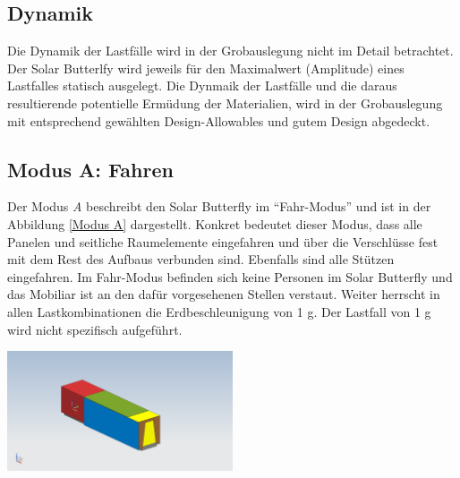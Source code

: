 \subsection{Dynamik}
Die Dynamik der Lastfälle wird in der Grobauslegung nicht im Detail betrachtet. Der Solar Butterlfy wird jeweils für den Maximalwert (Amplitude) eines Lastfalles statisch ausgelegt. Die Dynmaik der Lastfälle und die daraus resultierende potentielle Ermüdung der Materialien, wird in der Grobauslegung mit entsprechend gewählten Design-Allowables und gutem Design abgedeckt.

\subsection{Modus A: Fahren}
Der Modus \emph{A} beschreibt den Solar Butterfly im ``Fahr-Modus'' und ist in der Abbildung \ref{Modus A} dargestellt. Konkret bedeutet dieser Modus, dass alle Panelen und seitliche Raumelemente eingefahren und über die Verschlüsse fest mit dem Rest des Aufbaus verbunden sind. Ebenfalls sind alle Stützen eingefahren. Im Fahr-Modus befinden sich keine Personen im Solar Butterfly und das Mobiliar ist an den dafür vorgesehenen Stellen verstaut. Weiter herrscht in allen Lastkombinationen die Erdbeschleunigung von 1 g. Der Lastfall von 1 g wird nicht spezifisch aufgeführt.

\begin{center}
  \includegraphics[width=0.5\textwidth]{04_Figures/A.png}
  \label{Modus A}
\end{center}

